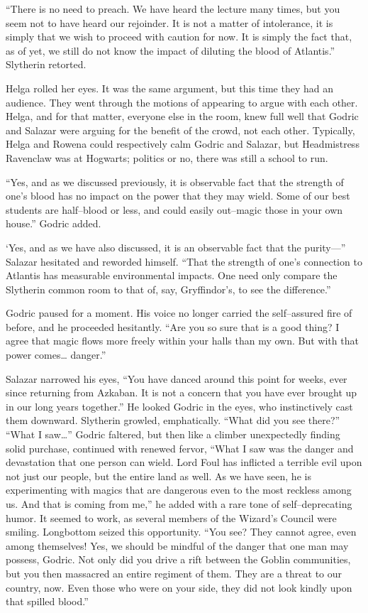 “There is no need to preach. We have heard the lecture many times, but you seem not to have heard our rejoinder. It is not a matter of intolerance, it is simply that we wish to proceed with caution for now. It is simply the fact that, as of yet, we still do not know the impact of diluting the blood of Atlantis.” Slytherin retorted.

Helga rolled her eyes. It was the same argument, but this time they had an audience. They went through the motions of appearing to argue with each other. Helga, and for that matter, everyone else in the room, knew full well that Godric and Salazar were arguing for the benefit of the crowd, not each other. Typically, Helga and Rowena could respectively calm Godric and Salazar, but Headmistress Ravenclaw was at Hogwarts; politics or no, there was still a school to run.

“Yes, and as we discussed previously, it is observable fact that the strength of one’s blood has no impact on the power that they may wield. Some of our best students are half\mbox{--}blood or less, and could easily out\mbox{--}magic those in your own house.” Godric added.

‘Yes, and as we have also discussed, it is an observable fact that the purity\mbox{---}” Salazar hesitated and reworded himself. “That the strength of one’s connection to Atlantis has measurable environmental impacts. One need only compare the Slytherin common room to that of, say, Gryffindor’s, to see the difference.”

Godric paused for a moment. His voice no longer carried the self\mbox{--}assured fire of before, and he proceeded hesitantly. “Are you so sure that is a good thing? I agree that magic flows more freely within your halls than my own. But with that power comes… danger.”

Salazar narrowed his eyes, “You have danced around this point for weeks, ever since returning from Azkaban. It is not a concern that you have ever brought up in our long years together.” He looked Godric in the eyes, who instinctively cast them downward. Slytherin growled, emphatically. “What did you see there?”
\SmallVSpace
“What I saw…” Godric faltered, but then like a climber unexpectedly finding solid purchase, continued with renewed fervor, “What I saw was the danger and devastation that one person can wield. Lord Foul has inflicted a terrible evil upon not just our people, but the entire land as well. As we have seen, he is experimenting with magics that are dangerous even to the most reckless among us. And that is coming from me,” he added with a rare tone of self\mbox{--}deprecating humor. It seemed to work, as several members of the Wizard’s Council were smiling.
\SmallVSpace
Longbottom seized this opportunity. “You see? They cannot agree, even among themselves! Yes, we should be mindful of the danger that one man may possess, Godric. Not only did you drive a rift between the Goblin communities, but you then massacred an entire regiment of them. They are a threat to our country, now. Even those who were on your side, they did not look kindly upon that spilled blood.”


